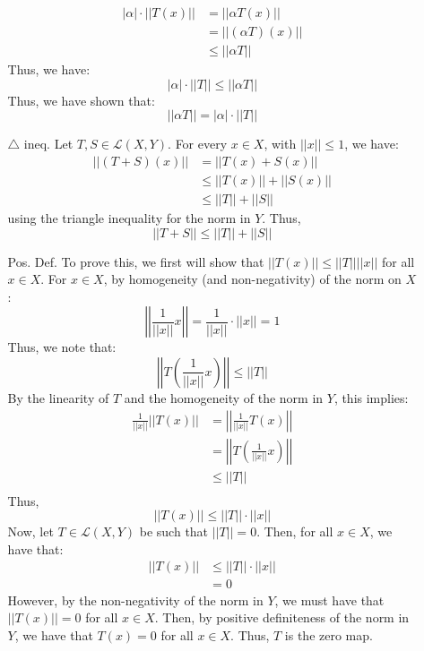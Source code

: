 \documentclass[12pt]{article}
\begin{document}
\begin{solution}
\begin{enumerate}
\begin{enumerate}
\begin{align*}
                |\alpha| \cdot ||T(x)|| &= ||\alpha T(x) || \\
                &= ||(\alpha T)(x)|| \\
                &\leq ||\alpha T||
            \end{align*}
            Thus, we have:
            \[ |\alpha| \cdot ||T|| \leq ||\alpha T||\]
            Thus, we have shown that:
            \[ ||\alpha T|| = |\alpha| \cdot ||T||\]
            \item[$\triangle$ ineq.] Let $T, S \in \mathcal{L}(X, Y)$. For every $x \in X$, with $||x|| \leq 1$, we have: 
            \begin{align*}
                ||(T+S)(x)|| &= ||T(x) + S(x)||  \\
                &\leq ||T(x)|| + ||S(x)|| \\
                &\leq ||T|| + ||S||
            \end{align*}
            using the triangle inequality for the norm in $Y$. Thus, 
            \[ ||T+S|| \leq ||T|| + ||S||\]
            \item[Pos. Def.] To prove this, we first will show that $||T(x)|| \leq ||T||||x||$ for all $x \in X$. For $x \in X$, by homogeneity (and non-negativity) of the norm on $X$: 
            \[  \left\lvert\left\lvert\frac{1}{||x||} x\right\rvert\right\rvert = \frac{1}{||x||}\cdot ||x|| = 1 \]
            Thus, we note that:
            \[  \left\lvert\left\lvert T\left(\frac{1}{||x||} x\right)\right\rvert\right\rvert \leq ||T|| \]
            By the linearity of $T$ and the homogeneity of the norm in $Y$, this implies:
            \begin{align*}
                \frac{1}{||x||} ||T(x)||  &= 
                \left\lvert\left\lvert \frac{1}{||x||} T(x)\right\rvert\right\rvert \\
                &=  \left\lvert\left\lvert T\left(\frac{1}{||x||} x\right)\right\rvert\right\rvert \\
                &\leq ||T|| \\
            \end{align*}
            Thus, 
            \[ ||T(x)|| \leq ||T|| \cdot ||x||\]
            Now, let $T \in \mathcal{L}(X, Y)$ be such that $||T|| = 0$. Then, for all $x \in X$, we have that: 
            \begin{align*}
                ||T(x)|| &\leq ||T|| \cdot ||x|| \\
                &= 0
            \end{align*}
            However, by the non-negativity of the norm in $Y$, we must have that $||T(x)|| = 0$ for all $x \in X$. Then, by positive definiteness of the norm in $Y$, we have that $T(x) = 0$ for all $x \in X$. Thus, $T$ is the zero map. \\

\end{enumerate}
\end{enumerate}
\end{solution}
\end{document}
